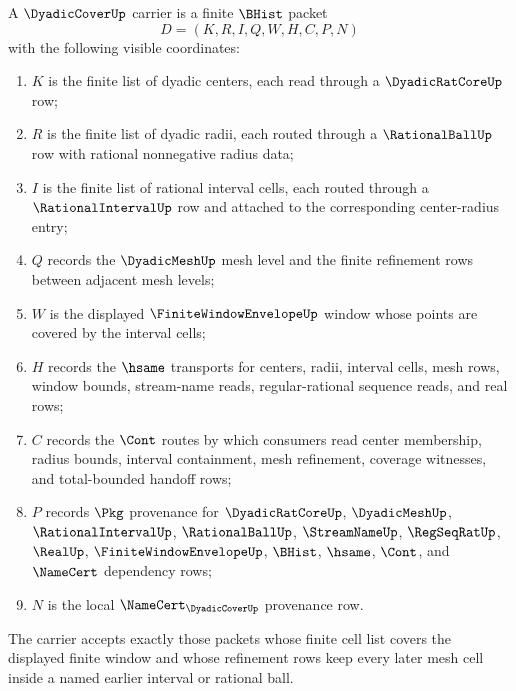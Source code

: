\begin{definition}
\label{def:dyadic-cover-carrier}
A $\DyadicCoverUp$ carrier is a finite $\BHist$ packet
$$
D=(K,R,I,Q,W,H,C,P,N)
$$
with the following visible coordinates:
\begin{enumerate}
\item $K$ is the finite list of dyadic centers, each read through a
$\DyadicRatCoreUp$ row;
\item $R$ is the finite list of dyadic radii, each routed through a
$\RationalBallUp$ row with rational nonnegative radius data;
\item $I$ is the finite list of rational interval cells, each routed through a
$\RationalIntervalUp$ row and attached to the corresponding center-radius
entry;
\item $Q$ records the $\DyadicMeshUp$ mesh level and the finite refinement rows
between adjacent mesh levels;
\item $W$ is the displayed $\FiniteWindowEnvelopeUp$ window whose points are
covered by the interval cells;
\item $H$ records the $\hsame$ transports for centers, radii, interval cells,
mesh rows, window bounds, stream-name reads, regular-rational sequence reads,
and real rows;
\item $C$ records the $\Cont$ routes by which consumers read center membership,
radius bounds, interval containment, mesh refinement, coverage witnesses, and
total-bounded handoff rows;
\item $P$ records $\Pkg$ provenance for $\DyadicRatCoreUp$, $\DyadicMeshUp$,
$\RationalIntervalUp$, $\RationalBallUp$, $\StreamNameUp$, $\RegSeqRatUp$,
$\RealUp$, $\FiniteWindowEnvelopeUp$, $\BHist$, $\hsame$, $\Cont$, and
$\NameCert$ dependency rows;
\item $N$ is the local $\NameCert_{\DyadicCoverUp}$ provenance row.
\end{enumerate}
The carrier accepts exactly those packets whose finite cell list covers the
displayed finite window and whose refinement rows keep every later mesh cell
inside a named earlier interval or rational ball.
\end{definition}

